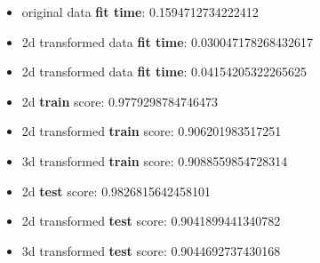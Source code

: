 \documentclass[12pt]{article}
\begin{document}
\begin{enumerate}[leftmargin=\parindent,align=left,labelwidth=\parindent,noitemsep]
\begin{itemize}[noitemsep,topsep=1pt]
    \begin{itemize}
        \item original data \textbf{fit time}: 0.1594712734222412
        \item 2d transformed data \textbf{fit time}: 0.030047178268432617
        \item 2d transformed data \textbf{fit time}: 0.04154205322265625 \\

        \item 2d \textbf{train} score: 0.9779298784746473
        \item 2d transformed \textbf{train} score: 0.906201983517251
        \item 3d transformed \textbf{train} score: 0.9088559854728314 \\
        
        \item 2d \textbf{test} score: 0.9826815642458101
        \item 2d transformed \textbf{test} score: 0.9041899441340782
        \item 3d transformed \textbf{test} score: 0.9044692737430168 \\
    

\end{itemize}
\end{itemize}
\end{enumerate}
\end{document}
